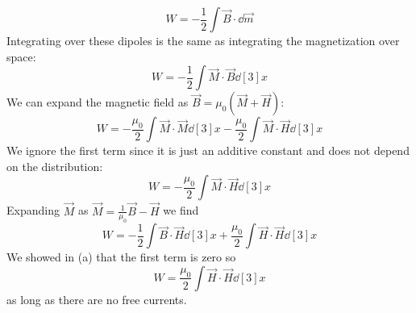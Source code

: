 \documentclass[a4paper,twoside]{article}
\begin{document}
\begin{itemize}
\begin{problem}
            \begin{equation}
                W = - \frac{1}{2} \int \vec{B} \cdot \dd{ \vec{m}}
            \end{equation}
            Integrating over these dipoles is the same as integrating the magnetization over space:
            \begin{equation}
                W = - \frac{1}{2} \int \vec{M} \cdot \vec{B} \dd[3]{x}
            \end{equation}
            We can expand the magnetic field as $ \vec{B} = \mu_0 ( \vec{M} + \vec{H}) $:
            \begin{equation}
                W = - \frac{\mu_0}{2} \int \vec{M} \cdot \vec{M} \dd[3]{x} - \frac{\mu_0}{2} \int \vec{M} \cdot \vec{H} \dd[3]{x}
            \end{equation}
            We ignore the first term since it is just an additive constant and does not depend on the distribution:
            \begin{equation}
                W = - \frac{\mu_0}{2} \int \vec{M} \cdot \vec{H} \dd[3]{x}
            \end{equation}
            Expanding $ \vec{M} $ as $ \vec{M} = \frac{1}{\mu_0} \vec{B} - \vec{H} $ we find
            \begin{equation}
                W = - \frac{1}{2} \int \vec{B} \cdot \vec{H} \dd[3]{x} + \frac{\mu_0}{2} \int \vec{H} \cdot \vec{H} \dd[3]{x}
            \end{equation}
            We showed in (a) that the first term is zero so
            \begin{equation}
                W = \frac{\mu_0}{2} \int \vec{H} \cdot \vec{H} \dd[3]{x}
            \end{equation}
            as long as there are no free currents.
        \end{problem}
\end{itemize}
\end{document}
